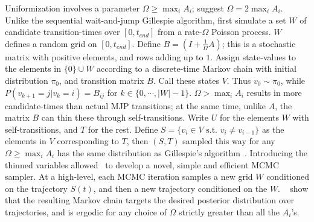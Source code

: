 Uniformization involves a parameter 
$\Omega \ge \max_i A_i$; \cite{RaoTeh13} suggest $\Omega = 2 \max_i A_i$. 
Unlike the sequential wait-and-jump Gillespie algorithm, first simulate 
a set $W$ of candidate
transition-times over $[0,t_{end}]$ from a rate-$\Omega$ 
Poisson process. $W$ %
defines a random grid on $[0,t_{end}]$.
Define $B = \left(I +\frac{1}{\Omega}A\right)$; this is a
stochastic matrix with positive elements, and rows adding up to $1$.
Assign state-values to the elements in $\{0\} \cup W$ according to a discrete-time 
Markov chain with initial distribution $\pi_0$, and transition matrix $B$.
Call these states $V$. Thus $v_0 \sim \pi_0$, while $P(v_{k+1}=j|v_k=i) = B_{ij}$
for $k \in \{0,\cdots,|W|-1\}$.
$\Omega > \max_i A_i$ results in more
candidate-times than actual MJP transitions; at the same time, unlike $A$, 
the matrix $B$ can thin these through self-transitions. Write $U$ for 
the elements $W$ with self-transitions, and $T$ for the rest.
Define $S=\{v_i \in V \text{ s.t.\ } v_i \neq v_{i-1}\}$
as the elements in $V$ corresponding to $T$, then $(S,T)$
sampled this way for any $\Omega \ge \max_i A_i$
has the same distribution as Gillespie's algorithm~\cite{Jen1953,RaoTeh13}.
Introducing the thinned variables allowed~\cite{RaoTeh13} to develop
a novel, simple and efficient MCMC sampler. At a 
high-level, each MCMC iteration 
samples a new grid $W$ conditioned on the trajectory $S(t)$, 
and then a new trajectory conditioned on the $W$. 
    ~\cite{RaoTeh13} show that the resulting Markov chain targets
    the desired posterior distribution over trajectories, and is 
    ergodic for any choice of $\Omega$ strictly greater than all the
    $A_i$'s. 
  \vspace{-.12in}
